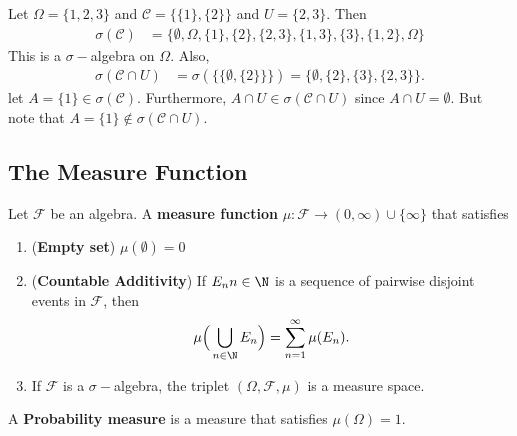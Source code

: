 \begin{eg}
    Let \( \Omega = \{  1,2,3 \}  \) and \( \mathcal{C} = \{  \{ 1 \} , \{ 2 \}  \}   \) and \( U = \{ 2,3 \}  \). Then
\begin{align*}
    \sigma(\mathcal{C}) &= \{ \emptyset , \Omega, \{ 1 \} , \{ 2 \} , \{ 2,3\} ,  \{  1,3 \}, \{  3  \}, \{  1,2 \} , \Omega    \}  
\end{align*}
This is a \( \sigma- \)algebra on \( \Omega \). Also,
\begin{align*}
    \sigma(\mathcal{C} \cap U) &= \sigma(\{  \{ \emptyset, \{ 2 \}  \}  \} ) = \{ \emptyset , \{ 2 \} , \{ 3 \}  , \{ 2,3 \}  \}.
\end{align*}
let \( A = \{  1  \} \in \sigma(\mathcal{C}) \). Furthermore, \( A \cap U \in \sigma(\mathcal{C} \cap U) \) since \( A \cap U = \emptyset \). But note that \( A = \{  1  \}  \notin \sigma(\mathcal{C} \cap U) \).
\end{eg}

\subsection{The Measure Function}

\begin{definition}
    Let \( \mathcal{F} \) be an algebra. A \textbf{measure function} \( \mu : \mathcal{F} \to (0,\infty ) \cup \{ \infty  \}  \) that satisfies 
    \begin{enumerate}
        \item[(1)] (\textbf{Empty set}) \( \mu(\emptyset) = 0  \)
        \item[(2)] (\textbf{Countable Additivity}) If \( {E}_{n}  n \in \N  \)  is a sequence of pairwise disjoint events in \( \mathcal{F} \), then
            \[  \mu \Big(  \bigcup_{ n \in \N }^{   }  {E}_{n} \Big) = \sum_{ n= 1  }^{ \infty  } \mu({E}_{n}). \]
        \item[(3)] If \( \mathcal{F} \) is a \( \sigma- \)algebra, the triplet \( (\Omega, \mathcal{F}, \mu) \) is a measure space.
    \end{enumerate}
\end{definition}

\begin{definition}
    A \textbf{Probability measure} is a measure that satisfies \( \mu(\Omega) = 1  \).
\end{definition}
